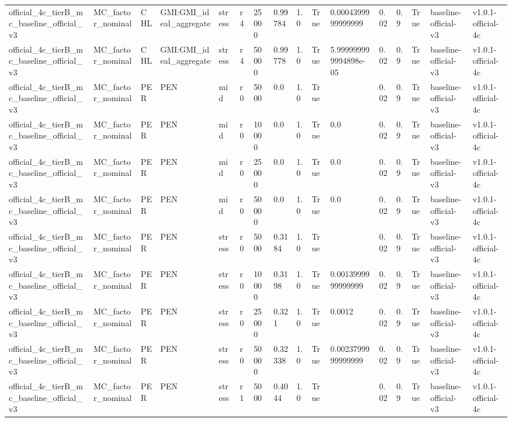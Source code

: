 \begin{table}[!htbp]
\begin{tabular}{llllllllllllllll}
official\_4c\_tierB\_mc\_baseline\_official\_v3 & MC\_factor\_nominal & CHL & GMI:GMI\_ideal\_aggregate & stress & r4 & 25000 & 0.99784 & 1.0 & True & 0.0004399999999999 & 0.02 & 0.9 & True & baseline-official-v3 & v1.0.1-official-4c \\
official\_4c\_tierB\_mc\_baseline\_official\_v3 & MC\_factor\_nominal & CHL & GMI:GMI\_ideal\_aggregate & stress & r4 & 50000 & 0.99778 & 1.0 & True & 5.999999999994898e-05 & 0.02 & 0.9 & True & baseline-official-v3 & v1.0.1-official-4c \\
official\_4c\_tierB\_mc\_baseline\_official\_v3 & MC\_factor\_nominal & PER & PEN & mid & r0 & 5000 & 0.0 & 1.0 & True &  & 0.02 & 0.9 & True & baseline-official-v3 & v1.0.1-official-4c \\
official\_4c\_tierB\_mc\_baseline\_official\_v3 & MC\_factor\_nominal & PER & PEN & mid & r0 & 10000 & 0.0 & 1.0 & True & 0.0 & 0.02 & 0.9 & True & baseline-official-v3 & v1.0.1-official-4c \\
official\_4c\_tierB\_mc\_baseline\_official\_v3 & MC\_factor\_nominal & PER & PEN & mid & r0 & 25000 & 0.0 & 1.0 & True & 0.0 & 0.02 & 0.9 & True & baseline-official-v3 & v1.0.1-official-4c \\
official\_4c\_tierB\_mc\_baseline\_official\_v3 & MC\_factor\_nominal & PER & PEN & mid & r0 & 50000 & 0.0 & 1.0 & True & 0.0 & 0.02 & 0.9 & True & baseline-official-v3 & v1.0.1-official-4c \\
official\_4c\_tierB\_mc\_baseline\_official\_v3 & MC\_factor\_nominal & PER & PEN & stress & r0 & 5000 & 0.3184 & 1.0 & True &  & 0.02 & 0.9 & True & baseline-official-v3 & v1.0.1-official-4c \\
official\_4c\_tierB\_mc\_baseline\_official\_v3 & MC\_factor\_nominal & PER & PEN & stress & r0 & 10000 & 0.3198 & 1.0 & True & 0.0013999999999999 & 0.02 & 0.9 & True & baseline-official-v3 & v1.0.1-official-4c \\
official\_4c\_tierB\_mc\_baseline\_official\_v3 & MC\_factor\_nominal & PER & PEN & stress & r0 & 25000 & 0.321 & 1.0 & True & 0.0012 & 0.02 & 0.9 & True & baseline-official-v3 & v1.0.1-official-4c \\
official\_4c\_tierB\_mc\_baseline\_official\_v3 & MC\_factor\_nominal & PER & PEN & stress & r0 & 50000 & 0.32338 & 1.0 & True & 0.0023799999999999 & 0.02 & 0.9 & True & baseline-official-v3 & v1.0.1-official-4c \\
official\_4c\_tierB\_mc\_baseline\_official\_v3 & MC\_factor\_nominal & PER & PEN & stress & r1 & 5000 & 0.4044 & 1.0 & True &  & 0.02 & 0.9 & True & baseline-official-v3 & v1.0.1-official-4c \\

\end{tabular}
\end{table}
